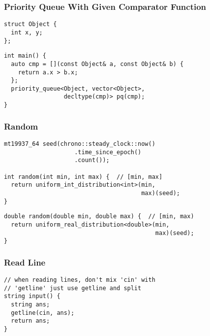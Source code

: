 \documentclass[twoside]{article}
\newcommand{\fileTitleStyle}{\large\underline}
\begin{document}
\begin{multicols*}{2}
\subsubsectionfont{\centering\bfseries\Large}
\subsubsectionfont{\fileTitleStyle}
\subsubsection*{Priority Queue With Given Comparator Function}
\begin{verbatim}
struct Object {
  int x, y;
};
\end{verbatim}
\vspace{-12pt}
\begin{verbatim}
int main() {
  auto cmp = [](const Object& a, const Object& b) {
    return a.x > b.x;
  };
  priority_queue<Object, vector<Object>,
                 decltype(cmp)> pq(cmp);
}
\end{verbatim}

\subsubsectionfont{\centering\bfseries\Large}
\subsubsectionfont{\fileTitleStyle}
\subsubsection*{Random}
\begin{verbatim}
mt19937_64 seed(chrono::steady_clock::now()
                    .time_since_epoch()
                    .count());

int random(int min, int max) {  // [min, max]
  return uniform_int_distribution<int>(min,
                                       max)(seed);
}
\end{verbatim}
\vspace{-12pt}
\begin{verbatim}
double random(double min, double max) {  // [min, max)
  return uniform_real_distribution<double>(min,
                                           max)(seed);
}
\end{verbatim}

\subsubsectionfont{\centering\bfseries\Large}
\subsubsectionfont{\fileTitleStyle}
\subsubsection*{Read Line}
\begin{verbatim}
// when reading lines, don't mix 'cin' with
// 'getline' just use getline and split
string input() {
  string ans;
  getline(cin, ans);
  return ans;
}
\end{verbatim}


\end{multicols*}
\end{document}

